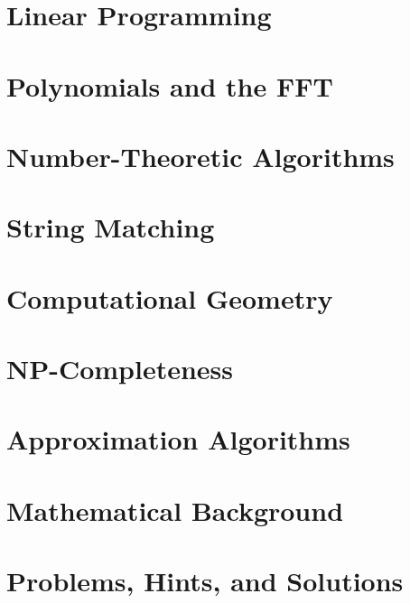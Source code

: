 \documentclass{book}
\begin{document}
\chapter{Linear Programming}




\chapter{Polynomials and the FFT}




\chapter{Number-Theoretic Algorithms}




\chapter{String Matching}




\chapter{Computational Geometry}




\chapter{NP-Completeness}




\chapter{Approximation Algorithms}




\chapter{Mathematical Background}




\chapter{Problems, Hints, and Solutions}
\end{document}
